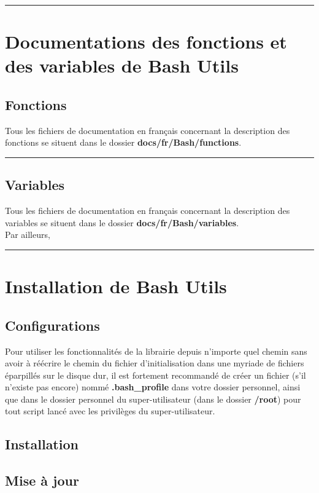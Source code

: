 \documentclass[a4paper,10pt]{article}
\begin{document}
\color{red}\par\noindent\rule{\textwidth}{0.4pt}\color{white}

\color{red}
\section{Documentations des fonctions et des variables de Bash Utils}\color{white}

\color{green}
\subsection{Fonctions}\color{white}
Tous les fichiers de documentation en français concernant la description des fonctions se situent dans le dossier \color{lime}\textbf{docs/fr/Bash/functions}\color{white}.\\[1\baselineskip]



\color{green}\par\noindent\rule{\textwidth}{0.4pt}\color{white}

\color{green}
\subsection{Variables}\color{white}
Tous les fichiers de documentation en français concernant la description des variables se situent dans le dossier \color{lime}\textbf{docs/fr/Bash/variables}\color{white}.\\[1\baselineskip]

Par ailleurs, \\[1\baselineskip]

\color{red}\par\noindent\rule{\textwidth}{0.4pt}\color{white}

\color{red}
\section{Installation de Bash Utils}\color{white}

\color{green}
\subsection{Configurations}\color{white}
Pour utiliser les fonctionnalités de la librairie depuis n'importe quel chemin sans avoir à réécrire le chemin du fichier d'initialisation dans une myriade de fichiers éparpillés sur le disque dur, il est fortement recommandé de créer un fichier (s'il n'existe pas encore) nommé \color{lime}\textbf{.bash\_profile}\color{white} dans votre dossier personnel, ainsi que dans le dossier personnel du super-utilisateur (dans le dossier \color{lime}\textbf{/root}\color{white}) pour tout script lancé avec les privilèges du super-utilisateur.

\color{green}
\subsection{Installation}\color{white}

\color{green}
\subsection{Mise à jour}\color{white}
\end{document}
